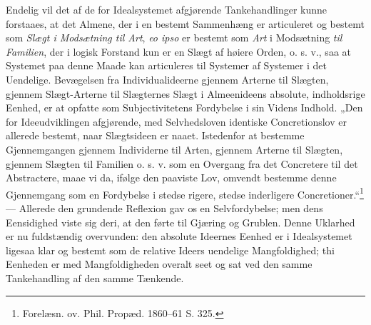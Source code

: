 \documentclass[11pt]{book}
\newcommand{\opage}[1]{\marginnote{\footnotesize\textit{[#1]}}}
\begin{document}
Endelig vil det af de for Idealsystemet afgjørende Tankehandlinger kunne
forstaaes, at det Almene, der i en bestemt Sammenhæng er articuleret og
bestemt som \emph{Slægt i Modsætning til Art}, \textit{eo ipso} er
bestemt som \emph{Art} i Modsætning \emph{til Familien}, der i logisk
Forstand kun er en Slægt af høiere Orden, o. s. v., saa at Systemet paa
denne Maade kan articuleres til Systemer af Systemer i det Uendelige.
Bevægelsen fra Individualideerne gjennem Arterne til Slægten, gjennem
Slægt-Arterne til Slægternes Slægt i Almeenideens absolute,
indholdsrige Eenhed, er at opfatte som Subjectivitetens Fordybelse i sin
Videns Indhold. „Den for Ideeudviklingen afgjørende, med Selvhedsloven
identiske Concretionslov er allerede bestemt, naar Slægtsideen er naaet.
Istedenfor at bestemme Gjennemgangen gjennem Individerne til Arten,
gjennem Arterne til Slægten, gjennem Slægten til Familien o. s. v. som en
Overgang fra det Concretere til det Abstractere, maae vi da, ifølge den
paaviste Lov, omvendt bestemme denne Gjennemgang som en Fordybelse i
stedse rigere, stedse inderligere
Concretioner.“\footnote{Forelæsn. ov. Phil. Propæd. 1860--61 S. 325.}
--- Allerede den grundende Reflexion gav os en Selvfordybelse; men dens
Eensidighed viste sig deri, at den førte til Gjæring og Grublen. Denne
Uklarhed er nu fuldstændig overvunden:
\opage{220} \setcounter{footnote}{0}%
den absolute Ideernes Eenhed er i Idealsystemet ligesaa klar og bestemt
som de relative Ideers uendelige Mangfoldighed; thi Eenheden er med
Mangfoldigheden overalt seet og sat ved den samme Tankehandling af den
samme Tænkende.
\end{document}
